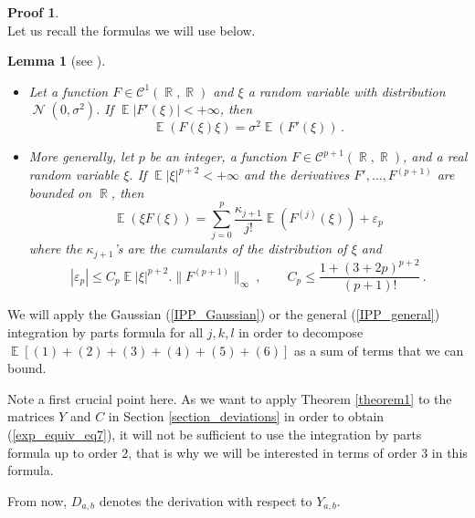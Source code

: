 \documentclass[11pt,a4paper]{article}
\DeclareMathOperator{\E}{\mathbb{E}}
\DeclareMathOperator{\R}{\mathbb{R}}
\DeclareMathOperator{\NN}{\mathcal{N}}
\DeclareMathOperator{\1}{\mathbf{1}}
\newtheorem{Lemma}[Proposition]{Lemma}
\theoremstyle{definition}
\newtheorem*{Proof}{Proof}
\begin{document}
\begin{Proof}
\noindent {}\\
Let us recall the formulas we will use below.

\begin{Lemma}[see {\cite[Formulas (2.1.39) and (18.1.19)]{PS}}] \label{IPP_lemma}
\begin{itemize}
\item[(i)] Let a function $F \in \mathcal{C}^1(\R,\R)$ and $\xi$ a random variable with distribution $\NN(0,\sigma^2)$. If $\E |F'(\xi)| < +\infty$, then
\begin{equation} \label{IPP_Gaussian}
\E \left( F(\xi)\xi \right) = \sigma^2 \E \left( F'(\xi) \right) \, .
\end{equation}
\item[(ii)] More generally, let $p$ be an integer, a function $F \in \mathcal{C}^{p+1}(\R,\R)$, and a real random variable $\xi$. If $\E |\xi|^{p+2} < +\infty$ and the derivatives $F',\ldots,F^{(p+1)}$ are bounded on $\R$, then
\begin{equation} \label{IPP_general}
\E \left( \xi F(\xi) \right) = \sum_{j=0}^p \frac{\kappa_{j+1}}{j!} \E(F^{(j)}(\xi)) + \varepsilon_p
\end{equation}
where the $\kappa_{j+1}$'s are the cumulants of the distribution of $\xi$ and
\begin{displaymath}
|\varepsilon_p| \le C_p \E |\xi|^{p+2} . \|F^{(p+1)}\|_{\infty} \ , \qquad C_p \le \frac{1+(3+2p)^{p+2}}{(p+1)!} \, .
\end{displaymath}
\end{itemize}
\end{Lemma}

We will apply the Gaussian (\ref{IPP_Gaussian}) or the general (\ref{IPP_general}) integration by parts formula for all $j,k,l$ in order to decompose $\E[(1)+(2)+(3)+(4)+(5)+(6)]$ as a sum of terms that we can bound.

Note a first crucial point here. As we want to apply Theorem \ref{theorem1} to the matrices $Y$ and $C$ in Section \ref{section_deviations} in order to obtain (\ref{exp_equiv_eq7}), it will not be sufficient to use the integration by parts formula up to order 2, that is why we will be interested in terms of order 3 in this formula.

From now, $D_{a,b}$ denotes the derivation with respect to $Y_{a,b}$.\\


\end{Proof}
\end{document}
